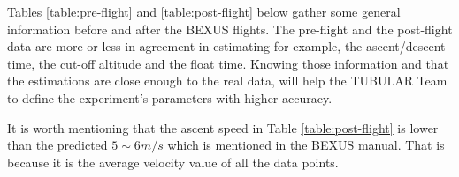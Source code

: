 \documentclass[a4paper,12pt,oneside]{article} %
\begin{document}
\begin{appendices}
\smallskip
Tables \ref{table:pre-flight} and \ref{table:post-flight} below gather some general information before and after the BEXUS flights. The pre-flight and the post-flight data are more or less in agreement in estimating for example, the ascent/descent time, the cut-off altitude and the float time. Knowing those information and that the estimations are close enough to the real data, will help the TUBULAR Team to define the experiment's parameters with higher accuracy. 

\smallskip
It is worth mentioning that the ascent speed in Table \ref{table:post-flight} is lower than the predicted $5\sim 6 m/s$ which is mentioned in the BEXUS manual. That is because it is the average velocity value of all the data points.  

\begin{table}[H]


\end{table}
\end{appendices}
\end{document}
